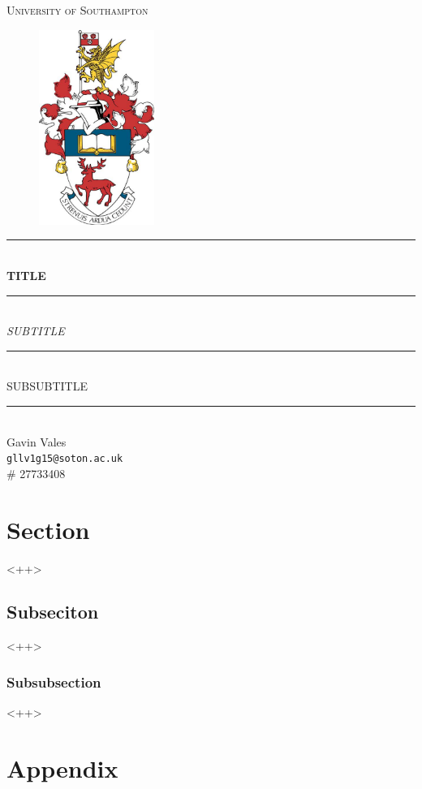 \documentclass[a4paper]{article}
\begin{document}
\begin{titlepage}
\begin{center}
\hfill\\
\hfill\\
{\Huge \textsc{University of Southampton}}\\
[1em]

\begin{figure}[H]
    \centering
    \includegraphics[height=2.5in]{logo}
    \label{fig:logo}
\end{figure}

\rule{\textwidth}{2pt}\\
[3em]
{\LARGE \textbf{TITLE}}\\
[2em]
\rule{\textwidth}{2pt}\\
[1em]
{\Large \textit{SUBTITLE}}\\
[0.5em]
\rule{0.5\textwidth}{1pt}\\
[1em]
\vfill
{\Large SUBSUBTITLE}\\
\rule{\textwidth}{0.5pt}\\
Gavin Vales\\
\texttt{gllv1g15@soton.ac.uk}\\
\# 27733408
\end{center}

\end{titlepage}

\tableofcontents
\newpage

\section{Section}
<++>

\subsection{Subseciton}
<++> 

\subsubsection{Subsubsection}
<++> 

\parencite{jenkins2003}

\newpage

\cite{jenkins2003}

\printbibliography

\newpage

\appendix
{}

\section{Appendix}
\end{document}
